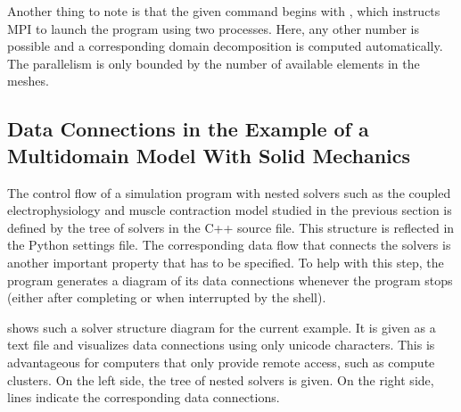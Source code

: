 Another thing to note is that the given command begins with , which instructs MPI to launch the program using two processes. Here, any other number is possible and a corresponding domain decomposition is computed automatically. The parallelism is only bounded by the number of available elements in the meshes.

\subsection{Data Connections in the Example of a Multidomain Model With Solid Mechanics}\label{sec:exemplary_usage_2b}

The control flow of a simulation program with nested solvers such as the coupled electrophysiology and muscle contraction model studied in the previous section is defined by the tree of solvers in the C++ source file. This structure is reflected in the Python settings file.
The corresponding data flow that connects the solvers is another important property that has to be specified.
To help with this step, the program generates a diagram of its data connections whenever the program stops (either after completing or when interrupted by the shell).

 shows such a solver structure diagram for the current example. It is given as a text file and visualizes data connections using only unicode characters. This is advantageous for computers that only provide remote access, such as compute clusters. 
On the left side, the tree of nested solvers is given. On the right side, lines indicate the corresponding data connections.

